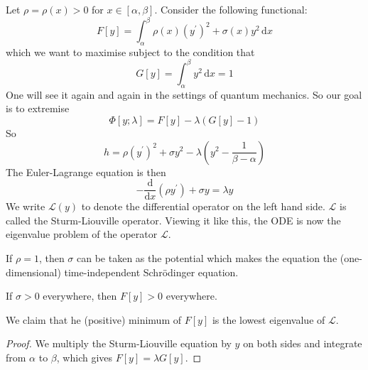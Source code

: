 \documentclass[a4paper]{article}
\begin{document}
\begin{example}\label{sturm-liouville}
    Let $\rho=\rho(x)>0$ for $x\in [\alpha,\beta]$.
    Consider the following functional:
    $$F[y]=\int_\alpha^\beta\rho(x)(y^\prime)^2+\sigma(x)y^2\,\mathrm dx$$
    which we want to maximise subject to the condition that
    $$G[y]=\int_\alpha^\beta y^2\,\mathrm dx=1$$
    One will see it again and again in the settings of quantum mechanics.
    So our goal is to extremise
    $$\Phi[y;\lambda]=F[y]-\lambda(G[y]-1)$$
    So
    $$h=\rho(y^\prime)^2+\sigma y^2-\lambda\left( y^2-\frac{1}{\beta-\alpha} \right)$$
    The Euler-Lagrange equation is then
    $$-\frac{\mathrm d}{\mathrm dx}(\rho y^\prime)+\sigma y=\lambda y$$
    We write $\mathcal L(y)$ to denote the differential operator on the left hand side.
    $\mathcal L$ is called the Sturm-Liouville operator.
    Viewing it like this, the ODE is now the eigenvalue problem of the operator $\mathcal L$.
\end{example}
\begin{remark}
    If $\rho=1$, then $\sigma$ can be taken as the potential which makes the equation the (one-dimensional) time-independent Schr\"odinger equation.
\end{remark}
If $\sigma>0$ everywhere, then $F[y]>0$ everywhere.
\begin{claim}
    We claim that he (positive) minimum of $F[y]$ is the lowest eigenvalue of $\mathcal L$.
\end{claim}
\begin{proof}
    We multiply the Sturm-Liouville equation by $y$ on both sides and integrate from $\alpha$ to $\beta$, which gives $F[y]=\lambda G[y]$.
\end{proof}
\end{document}

